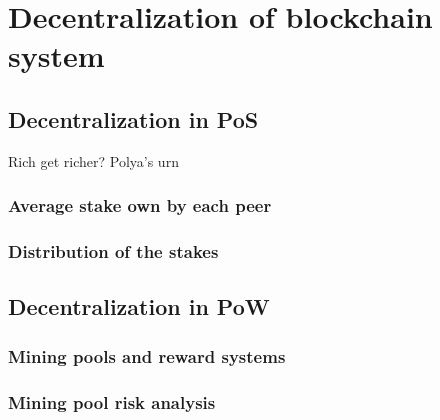 \chapter{Decentralization of blockchain system}\label{chap:decentralization}

\section{Decentralization in PoS}
Rich get richer? Polya's urn
\subsection{Average stake own by each peer}
\subsection{Distribution of the stakes}
\section{Decentralization in PoW}
\subsection{Mining pools and reward systems}
\subsection{Mining pool risk analysis}

\newpage